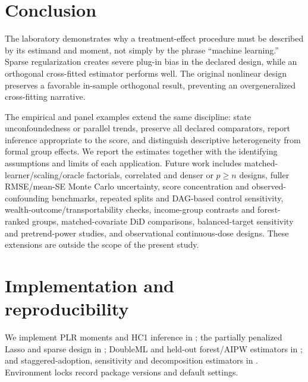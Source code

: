 \section{Conclusion}
The laboratory demonstrates why a treatment-effect procedure must be described by its estimand and moment, not simply by the phrase ``machine learning.'' Sparse regularization creates severe plug-in bias in the declared design, while an orthogonal cross-fitted estimator performs well. The original nonlinear design preserves a favorable in-sample orthogonal result, preventing an overgeneralized cross-fitting narrative.

The empirical and panel examples extend the same discipline: state unconfoundedness or parallel trends, preserve all declared comparators, report inference appropriate to the score, and distinguish descriptive heterogeneity from formal group effects. We report the estimates together with the identifying assumptions and limits of each application.
Future work includes matched-learner/scaling/oracle factorials, correlated and denser or $p\geq n$ designs, fuller RMSE/mean-SE Monte Carlo uncertainty, score concentration and observed-confounding benchmarks, repeated splits and DAG-based control sensitivity, wealth-outcome/transportability checks, income-group contrasts and forest-ranked groups, matched-covariate DiD comparisons, balanced-target sensitivity and pretrend-power studies, and observational continuous-dose designs. These extensions are outside the scope of the present study.

\clearpage
\appendix
\begingroup\small
\section{Implementation and reproducibility}
We implement PLR moments and HC1 inference in ; the partially penalized Lasso and sparse design in ; DoubleML and held-out forest/AIPW estimators in ; and staggered-adoption, sensitivity and decomposition estimators in . Environment locks record package versions and default settings.

